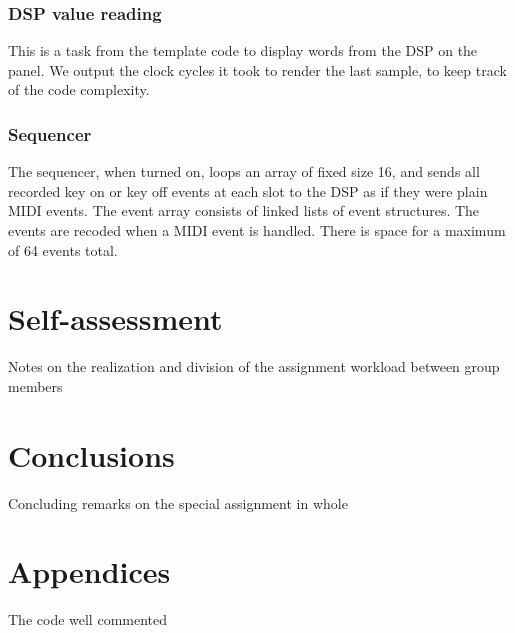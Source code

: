 \documentclass[10pt,a4paper,oneside]{article}
\begin{document}
\subsubsection{DSP value reading}

This is a task from the template code to display words from the DSP on the panel. We output the clock cycles it took to render the last sample, to keep track of the code complexity.

\subsubsection{Sequencer}

The sequencer, when turned on, loops an array of fixed size 16, and sends all recorded key on or key off events at each slot to the DSP as if they were plain MIDI events. The event array consists of linked lists of event structures. The events are recoded when a MIDI event is handled. There is space for a maximum of 64 events total.


\section{Self-assessment}

Notes on the realization and division of the assignment workload between group members


\section{Conclusions}

Concluding remarks on the special assignment in whole


\section{Appendices}

The code well commented



\end{document}
